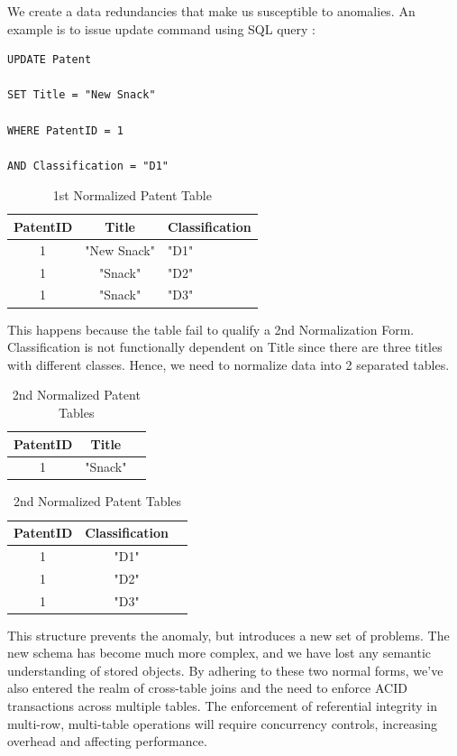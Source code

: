 \documentclass{article}
\begin{document}
We create a data redundancies that make us susceptible to anomalies. An example is to issue update command using SQL query :

\begin{lstlisting}[caption=Json Example]
UPDATE Patent 

SET Title = "New Snack"  

WHERE PatentID = 1 

AND Classification = "D1"
\end{lstlisting}

\begin{table}[H]
\begin{tabular}{|c|c|l|} \hline
PatentID&Title&Classification\\ \hline
1& "New Snack"& "D1"\\ \hline
1& "Snack"& "D2"\\ \hline
1& "Snack"& "D3"\\ \hline
\end{tabular}
\centering
\caption{1st Normalized Patent Table}
\end{table}

This happens because the table fail to qualify a 2nd Normalization Form. Classification is not functionally dependent on Title since there are three titles with different classes. Hence, we need to normalize data into 2 separated tables.

\begin{table}[H]
\centering
\begin{tabular}{|c|c|l|} \hline
PatentID&Title\\ \hline
1& "Snack"\\ \hline
\end{tabular}

\begin{tabular}{|c|c|l|} \hline
PatentID&Classification\\ \hline
1& "D1"\\ \hline
1& "D2"\\ \hline
1& "D3"\\ \hline
\end{tabular}
\centering

\centering
\caption{2nd Normalized Patent Tables}
\end{table}

This structure prevents the anomaly, but introduces a new set of problems. The new schema has become much more complex, and we have lost any semantic understanding of stored objects. By adhering to these two normal forms, we've also entered the realm of cross-table joins and the need to enforce ACID transactions across multiple tables. The enforcement of referential integrity in multi-row, multi-table operations will require concurrency controls, increasing overhead and affecting performance.
\end{document}
